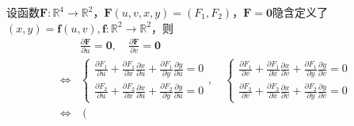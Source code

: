 \documentclass[main.tex]{subfiles}
\begin{document}
\begin{example}\label{exp:II.12.2}
    设函数$\mathbf{F}:\mathbb{R}^4\rightarrow\mathbb{R}^2$，$\mathbf{F}\left(u,v,x,y\right)=\left(F_1,F_2\right)$，$\mathbf{F}=\mathbf{0}$隐含定义了$\left(x,y\right)=\mathbf{f}\left(u,v\right),\mathbf{f}:\mathbb{R}^2\rightarrow\mathbb{R}^2$，则
    \begin{align*}
                        & \frac{\partial \mathbf{F}}{\partial u}=\mathbf{0},\quad\frac{\partial \mathbf{F}}{\partial v}=\mathbf{0}                                                                                                                                                                                                                                                                                                                                                                         \\
        \Leftrightarrow & \left\{\begin{array}{l}
                                     \frac{\partial F_1}{\partial u}+\frac{\partial F_1}{\partial x}\frac{\partial x}{\partial u}+\frac{\partial F_1}{\partial y}\frac{\partial y}{\partial u}=0 \\
                                     \frac{\partial F_2}{\partial u}+\frac{\partial F_2}{\partial x}\frac{\partial x}{\partial u}+\frac{\partial F_2}{\partial y}\frac{\partial y}{\partial u}=0
                                 \end{array}\right.,\quad\left\{\begin{array}{l}
                                                                    \frac{\partial F_1}{\partial v}+\frac{\partial F_1}{\partial x}\frac{\partial x}{\partial v}+\frac{\partial F_1}{\partial y}\frac{\partial y}{\partial v}=0 \\
                                                                    \frac{\partial F_2}{\partial v}+\frac{\partial F_2}{\partial x}\frac{\partial x}{\partial v}+\frac{\partial F_2}{\partial y}\frac{\partial y}{\partial v}=0
                                                                \end{array}\right.                                                                                                                                                                                                                                                                                \\
        \Leftrightarrow & \left(\begin{array}{cc}

\end{array}
\end{align*}
\end{example}
\end{document}

